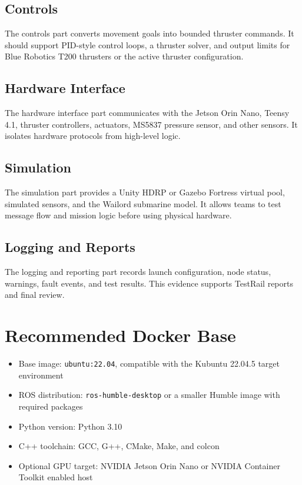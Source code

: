 \documentclass[12pt]{article}
\begin{document}
\subsection{Controls}
The controls part converts movement goals into bounded thruster commands. It should support PID-style control loops, a thruster solver, and output limits for Blue Robotics T200 thrusters or the active thruster configuration.

\subsection{Hardware Interface}
The hardware interface part communicates with the Jetson Orin Nano, Teensy 4.1, thruster controllers, actuators, MS5837 pressure sensor, and other sensors. It isolates hardware protocols from high-level logic.

\subsection{Simulation}
The simulation part provides a Unity HDRP or Gazebo Fortress virtual pool, simulated sensors, and the Wailord submarine model. It allows teams to test message flow and mission logic before using physical hardware.

\subsection{Logging and Reports}
The logging and reporting part records launch configuration, node status, warnings, fault events, and test results. This evidence supports TestRail reports and final review.

\section{Recommended Docker Base}
\begin{itemize}[leftmargin=*]
  \item Base image: \texttt{ubuntu:22.04}, compatible with the Kubuntu 22.04.5 target environment
  \item ROS distribution: \texttt{ros-humble-desktop} or a smaller Humble image with required packages
  \item Python version: Python 3.10
  \item C++ toolchain: GCC, G++, CMake, Make, and colcon
  \item Optional GPU target: NVIDIA Jetson Orin Nano or NVIDIA Container Toolkit enabled host
\end{itemize}
\end{document}
